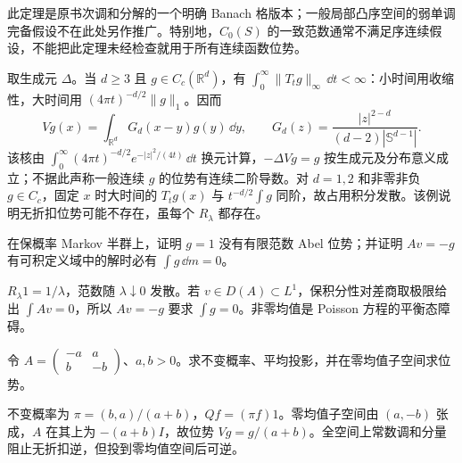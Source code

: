 此定理是原书次调和分解的一个明确 Banach 格版本；一般局部凸序空间的弱单调完备假设不在此处另作推广。特别地，$C_0(S)$ 的一致范数通常不满足序连续假设，不能把此定理未经检查就用于所有连续函数位势。

\begin{example}[欧氏热核的暂留与再返界限]\label{exm:y13-green}
取生成元 $\Delta$。当 $d\ge3$ 且 $g\in C_c(\mathbb R^d)$，有 $\int_0^\infty\|T_tg\|_\infty\,\dd t<\infty$：小时间用收缩性，大时间用 $(4\pi t)^{-d/2}\|g\|_1$。因而
\[
 Vg(x)=\int_{\mathbb R^d}G_d(x-y)g(y)\,\dd y,\qquad
 G_d(z)=\frac{|z|^{2-d}}{(d-2)|\mathbb S^{d-1}|}.
\]
该核由 $\int_0^\infty(4\pi t)^{-d/2}e^{-|z|^2/(4t)}\,\dd t$ 换元计算，$-\Delta Vg=g$ 按生成元及分布意义成立；不据此声称一般连续 $g$ 的位势有连续二阶导数。对 $d=1,2$ 和非零非负 $g\in C_c$，固定 $x$ 时大时间的 $T_tg(x)$ 与 $t^{-d/2}\int g$ 同阶，故占用积分发散。该例说明无折扣位势可能不存在，虽每个 $R_\lambda$ 都存在。
\end{example}

\begin{exercise}[平衡态的障碍]\label{ex:y13-potential-obstruction}
在保概率 Markov 半群上，证明 $g=1$ 没有有限范数 Abel 位势；并证明 $Av=-g$ 有可积定义域中的解时必有 $\int g\,\dd m=0$。
\end{exercise}
\begin{solution}
$R_\lambda1=1/\lambda$，范数随 $\lambda\downarrow0$ 发散。若 $v\in D(A)\subset L^1$，保积分性对差商取极限给出 $\int Av=0$，所以 $Av=-g$ 要求 $\int g=0$。非零均值是 Poisson 方程的平衡态障碍。
\end{solution}

\begin{exercise}[有限链上的调和与位势]\label{ex:y13-two-state-potential}
令 $A=\left(\begin{smallmatrix}-a&a\\b&-b\end{smallmatrix}\right)$、$a,b>0$。求不变概率、平均投影，并在零均值子空间求位势。
\end{exercise}
\begin{solution}
不变概率为 $\pi=(b,a)/(a+b)$，$Qf=(\pi f)1$。零均值子空间由 $(a,-b)$ 张成，$A$ 在其上为 $-(a+b)I$，故位势 $Vg=g/(a+b)$。全空间上常数调和分量阻止无折扣逆，但投到零均值空间后可逆。
\end{solution}
